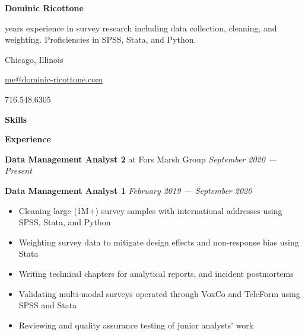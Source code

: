\documentclass[12pt]{article}
\begin{document}
\begin{vwcol}[widths={0.65,0.35},justify=flush,rule=0pt]
\Huge
\noindent \textbf{Dominic Ricottone}
\normalsize

\vspace{.5em}
 years experience in survey research including data collection, cleaning, and weighting.
Proficiencies in SPSS, Stata, and Python.

\noindent {} Chicago, Illinois

\vspace{.5em}
\noindent {} \href{mailto:me@dominic-ricottone.com}{me@dominic-ricottone.com}

\vspace{.5em}
\noindent {} 716.548.6305
\end{vwcol}

\vspace{.5em}
\large
\noindent \textbf{Skills} \hrulefill
\normalsize

\vspace{.5em}

\tcbox{\strut \LaTeX}
\vspace{1em}

\large
\noindent \textbf{Experience} \hrulefill
\normalsize
\vspace{.5em}

\noindent \textbf{Data Management Analyst 2} at Fors Marsh Group \hfill \textit{September 2020 --- Present}
\vspace{.5em}

\noindent \textbf{Data Management Analyst 1} \hfill \textit{February 2019 --- September 2020}
\begin{itemize}[]
\item Cleaning large (1M+) survey samples with international addresses using SPSS, Stata, and Python
\item Weighting survey data to mitigate design effects and non-response bias using Stata
\item Writing technical chapters for analytical reports, and incident postmortems
\item Validating multi-modal surveys operated through VoxCo and TeleForm using SPSS and Stata
\item Reviewing and quality assurance testing of junior analysts' work
\end{itemize}
\end{document}
